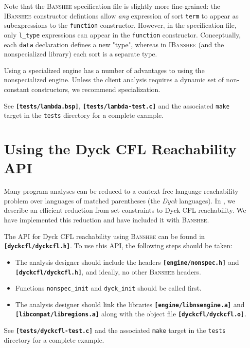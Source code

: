 \documentclass[10pt]{article}
\newcommand{\banshee}{\textsc{Banshee}}
\newcommand{\ibanshee}{\textsc{IBanshee}}
\newcommand{\file}[1]{\texttt{\textbf{[#1]}}}
\begin{document}
Note that the \banshee{} specification file is slightly more
fine-grained: the \ibanshee{} constructor defintions allow \emph{any}
expression of sort \texttt{term} to appear as subexpressions to the
\texttt{function} constructor. However, in the specification file,
only \texttt{l\_type} expressions can appear in the \texttt{function}
constructor. Conceptually, each \texttt{data} declaration defines a
new "type", whereas in \ibanshee{} (and the nonspecialized library)
each sort is a separate type.

Using a specialized engine has a number of advantages to using the
nonspecialized engine. Unless the client analysis requires a dynamic
set of non-constant constructors, we recommend specialization.

See \file{tests/lambda.bsp}, \file{tests/lambda-test.c} and the
associated \texttt{make} target in the \texttt{tests} directory for a
complete example.

\section{Using the Dyck CFL Reachability API}
\label{sec-dyckcfl}

Many program analyses can be reduced to a context free language
reachability problem over languages of matched parentheses (the
\emph{Dyck} languages). In \cite{kodumal:pldi04}, we describe an
efficient reduction from set constraints to Dyck CFL reachability. We
have implemented this reduction and have included it with \banshee{}.

The API for Dyck CFL reachability using \banshee{} can be found in
\file{dyckcfl/dyckcfl.h}. To use this API, the following steps should
be taken:

\begin{itemize}
\item The analysis designer should include the headers
  \file{engine/nonspec.h} and \file{dyckcfl/dyckcfl.h}, and ideally,
  no other \banshee{} headers.
\item Functions \texttt{nonspec\_init} and \texttt{dyck\_init} should
  be called first.
\item The analysis designer should link the libraries
  \file{engine/libnsengine.a} and \file{libcompat/libregions.a} along
  with the object file \file{dyckcfl/dyckcfl.o}.
\end{itemize}

See \file{tests/dyckcfl-test.c} and the associated \texttt{make}
target in the \texttt{tests} directory for a complete example.
\end{document}
